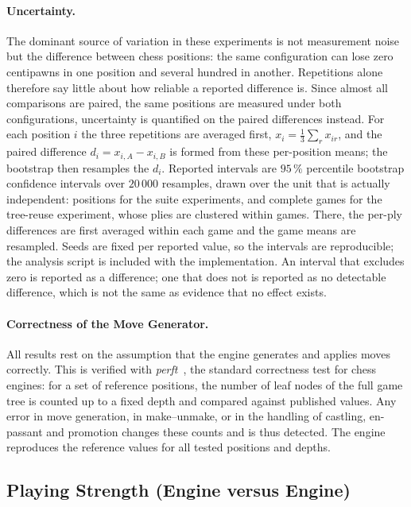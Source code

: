 \paragraph{Uncertainty.}
The dominant source of variation in these experiments is not measurement noise
but the difference between chess positions: the same configuration can lose zero
centipawns in one position and several hundred in another. Repetitions alone
therefore say little about how reliable a reported difference is. Since almost all comparisons are paired, the same positions are measured under
both configurations, uncertainty is quantified on the paired differences instead.
For each position $i$ the three repetitions are averaged first,
$x_i = \frac{1}{3}\sum_r x_{ir}$, and the paired difference
$d_i = x_{i,A} - x_{i,B}$ is formed from these per-position means; the bootstrap
then resamples the $d_i$. Reported intervals are $95\,\%$ percentile bootstrap
confidence intervals over $20\,000$ resamples, drawn over the unit that is
actually independent: positions for the suite experiments, and complete games for
the tree-reuse experiment, whose plies are clustered within games. There, the
per-ply differences are first averaged within each game and the game means are
resampled. Seeds are fixed per reported value, so the intervals are reproducible;
the analysis script is included with the implementation. An interval that
excludes zero is reported as a difference; one that does not is reported as no
detectable difference, which is not the same as evidence that no effect exists.

\paragraph{Correctness of the Move Generator.}
All results rest on the assumption that the engine generates and applies moves
correctly. This is verified with \emph{perft}~\cite{cpw_perft}, the standard
correctness test for
chess engines: for a set of reference positions, the number of leaf nodes of the
full game tree is counted up to a fixed depth and compared against published
values. Any error in move generation, in make--unmake, or in the handling of
castling, en-passant and promotion changes these counts and is thus detected. The
engine reproduces the reference values for all tested positions and depths.

\subsection{Playing Strength (Engine versus Engine)}
\label{subsec:engine_eval}

